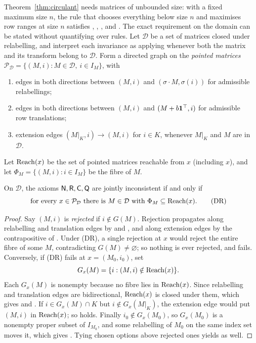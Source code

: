 Theorem~\ref{thm:circulant} needs matrices of unbounded size: with a fixed maximum size $n$, the rule
that chooses everything below size $n$ and maximises row ranges at size $n$ satisfies , ,
, and . The exact requirement on the domain can be stated without quantifying over
rules. Let $\mathcal D$ be a set of matrices closed under relabelling, and interpret each invariance as
applying whenever both the matrix and its transform belong to $\mathcal D$. Form a directed graph on the
\emph{pointed matrices} $\mathcal P_{\mathcal D}=\{(M,i):M\in\mathcal D,\ i\in I_M\}$, with
\begin{enumerate}[label=(\roman*)]
  \item edges in both directions between $(M,i)$ and $(\sigma\cdot M,\sigma(i))$ for admissible relabellings;
  \item edges in both directions between $(M,i)$ and $(M+b\mathbf{1}^\top,i)$ for admissible row translations;
  \item extension edges $(M|_K,i)\to(M,i)$ for $i\in K$, whenever $M|_K$ and $M$ are in $\mathcal D$.
\end{enumerate}
Let $\operatorname{Reach}(x)$ be the set of pointed matrices reachable from $x$ (including $x$), and let
$\Phi_M=\{(M,i):i\in I_M\}$ be the fibre of $M$.

\begin{theorem}\label{thm:DR}
On $\mathcal D$, the axioms $\textup{\textsf{N}},\textup{\textsf{R}},\textup{\textsf{C}},\textup{\textsf{Q}}$ are jointly inconsistent if and only if
\[
  \text{for every }x\in\mathcal P_{\mathcal D}\text{ there is }M\in\mathcal D\text{ with }\Phi_M\subseteq\operatorname{Reach}(x).
  \tag{DR}
\]
\end{theorem}

\begin{proof}
Say $(M,i)$ is \emph{rejected} if $i\notin G(M)$. Rejection propagates along relabelling and
translation edges by  and , and along extension edges by the contrapositive of . Under
(DR), a single rejection at $x$ would reject the entire fibre of some $M$, contradicting $G(M)\neq\varnothing$;
so nothing is ever rejected, and  fails. Conversely, if (DR) fails at $x=(M_0,i_0)$, set
\[
  G_x(M)=\{i:(M,i)\notin\operatorname{Reach}(x)\}.
\]
Each $G_x(M)$ is nonempty because no fibre lies in $\operatorname{Reach}(x)$. Since relabelling and translation
edges are bidirectional, $\operatorname{Reach}(x)$ is closed under them, which gives  and . If
$i\in G_x(M)\cap K$ but $i\notin G_x(M|_K)$, the extension edge would put $(M,i)$ in $\operatorname{Reach}(x)$; so 
holds. Finally $i_0\notin G_x(M_0)$, so $G_x(M_0)$ is a nonempty proper subset of $I_{M_0}$, and some
relabelling of $M_0$ on the same index set moves it, which gives . Tying chosen options above
rejected ones yields  as well.
\end{proof}

